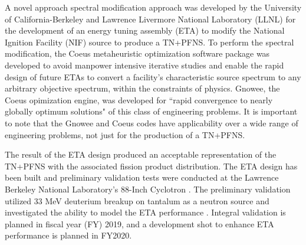 A novel approach spectral modification approach was developed by the University of California-Berkeley and Lawrence Livermore National Laboratory (LLNL) for the development of an energy tuning assembly (ETA) to modify the National Ignition Facility (NIF) source to produce a TN+PFNS\cite{Bevins}. 
To perform the spectral modification, the Coeus metaheuristic optimization software package was developed to avoid manpower intensive iterative studies and enable the rapid design of future ETAs to convert a facility's characteristic source spectrum to any arbitrary objective spectrum, within the constraints of physics\cite{Coeus}. 
Gnowee, the Coeus opimization engine, was developed for ``rapid convergence to nearly globally optimum solutions" of this class of engineering problems\cite{Bevins2018}. 
It is important to note that the Gnowee and Coeus codes have applicability over a wide range of engineering problems, not just for the production of a TN+PFNS.  

The result of the ETA design produced an acceptable representation of the TN+PFNS with the associated fission product distribution. 
The ETA design has been built and preliminary validation tests were conducted at the Lawrence Berkeley National Laboratory’s 88-Inch Cyclotron \cite{Bevins, Stickney}. 
The preliminary validation utilized 33 MeV deuterium breakup on tantalum as a neutron source and investigated the ability to model the ETA performance \cite{Stickney}.
Integral validation is planned in fiscal year (FY) 2019, and a development shot to enhance ETA performance is planned in FY2020. 

 
